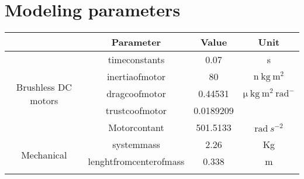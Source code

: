 	\chapter{Modeling parameters}
	

	\begin{table}[h]
		\centering
		\begin{tabular}{|c||c|c|c|}
			\hline
			\multicolumn{1}{|c|}{}                                     & \multicolumn{1}{c|}{Parameter} & \multicolumn{1}{c|}{Value} & Unit            \\ \hline\hline
			\multicolumn{1}{|c||}{\multirow{5}{*}{Brushless DC motors}} & \gls{timeconstants}               & 0.07                       & s               \\ \cline{2-4} 
			\multicolumn{1}{|c||}{}                                     & \gls{inertiaofmotor}                      & 80                         & $\mathrm{\ensuremath{n}~kg~m^{2}}$    \\ \cline{2-4} 
			\multicolumn{1}{|c||}{}                                     &\gls{dragcoofmotor}                       & 0.44531                 & $\mathrm{\mu~kg~m^2~rad^{-}}$ \\ \cline{2-4} 
			\multicolumn{1}{|c||}{}                                     & \gls{trustcoofmotor}                           								 & 0.0189209                     &                 \\ \cline{2-4} 
			\multicolumn{1}{|c||}{}                                     & \gls{Motorcontant}                               							& 501.5133                   &   $\mathrm{rad}~s^{-2}$         \\\hline
			\multirow{12}{*}{Mechanical}                       & \gls{systemmass}                         	  & 2.26                       & Kg              \\ \cline{2-4} 
			                                                                                        &\gls{lenghtfromcenterofmass}    & 0.338                      & m               \\ \cline{2-4} 
			                                                                                        

\end{tabular}
\end{table}
